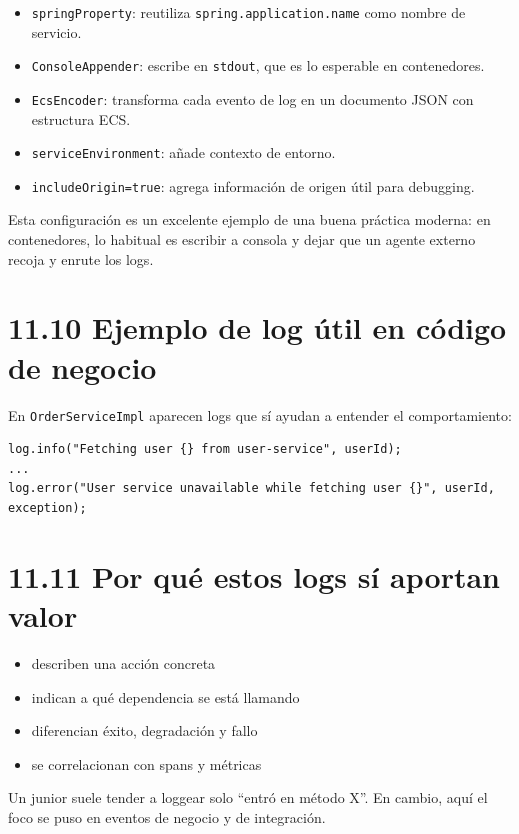 \documentclass[
a4paper,
12pt]{report}
\providecommand{\tightlist}{%
  \setlength{\itemsep}{0pt}\setlength{\parskip}{0pt}}
\begin{document}
\begin{itemize}
\tightlist
\item
  \texttt{springProperty}: reutiliza \texttt{spring.application.name}
  como nombre de servicio.
\item
  \texttt{ConsoleAppender}: escribe en \texttt{stdout}, que es lo
  esperable en contenedores.
\item
  \texttt{EcsEncoder}: transforma cada evento de log en un documento
  JSON con estructura ECS.
\item
  \texttt{serviceEnvironment}: añade contexto de entorno.
\item
  \texttt{includeOrigin=true}: agrega información de origen útil para
  debugging.
\end{itemize}

Esta configuración es un excelente ejemplo de una buena práctica
moderna: en contenedores, lo habitual es escribir a consola y dejar que
un agente externo recoja y enrute los logs.

\section{11.10 Ejemplo de log útil en código de
negocio}\label{ejemplo-de-log-uxfatil-en-cuxf3digo-de-negocio}

En \texttt{OrderServiceImpl} aparecen logs que sí ayudan a entender el
comportamiento:

\begin{verbatim}
log.info("Fetching user {} from user-service", userId);
...
log.error("User service unavailable while fetching user {}", userId, exception);
\end{verbatim}

\section{11.11 Por qué estos logs sí aportan
valor}\label{por-quuxe9-estos-logs-suxed-aportan-valor}

\begin{itemize}
\tightlist
\item
  describen una acción concreta
\item
  indican a qué dependencia se está llamando
\item
  diferencian éxito, degradación y fallo
\item
  se correlacionan con spans y métricas
\end{itemize}

Un junior suele tender a loggear solo ``entró en método X''. En cambio,
aquí el foco se puso en eventos de negocio y de integración.
\end{document}
